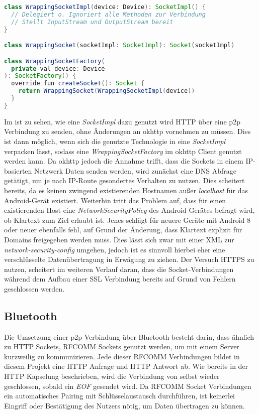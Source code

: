         \begin{lstlisting}[frame=bt, label={lst:android:socketfactory}, language=Java, caption=HTTP Kapselung als SocketFactory (Clientcode in Kotlin)]
class WrappingSocketImpl(device: Device): SocketImpl() {
  // Delegiert o. Ignoriert alle Methoden zur Verbindung
  // Stellt InputStream und OutputStream bereit
}

class WrappingSocket(socketImpl: SocketImpl): Socket(socketImpl)

class WrappingSocketFactory(
  private val device: Device
): SocketFactory() {
  override fun createSocket(): Socket {
    return WrappingSocket(WrappingSocketImpl(device))
  }
}
        \end{lstlisting}
        Im  ist zu sehen, wie eine {\it SocketImpl} dazu genutzt wird HTTP über eine p2p Verbindung zu senden, ohne Änderungen an okhttp vornehmen zu müssen. Dies ist dann möglich, wenn sich die genutzte Technologie in eine {\it SocketImpl} verpacken lässt, sodass eine {\it WrappingSocketFactory} im okhttp Client genutzt werden kann. Da okhttp jedoch die Annahme trifft, dass die Sockets in einem IP-basierten Netzwerk Daten senden werden, wird zunächst eine DNS Abfrage getätigt, um je nach IP-Route gesondertes Verhalten zu nutzen. Dies scheitert bereits, da es keinen zwingend existierenden Hostnamen außer {\it localhost} für das Android-Gerät existiert. Weiterhin tritt das Problem auf, dass für einen existierenden Host eine {\it NetworkSecurityPolicy} des Android Gerätes befragt wird, ob Klartext zum Ziel erlaubt ist. Jenes schlägt für neuere Geräte mit Android 8 oder neuer ebenfalls fehl, auf Grund der Änderung, dass Klartext explizit für Domains freigegeben werden muss. Dies lässt sich zwar mit einer XML zur {\it network-security-config} umgehen, jedoch ist es sinnvoll hierbei eher eine verschlüsselte Datenübertragung in Erwägung zu ziehen. Der Versuch HTTPS zu nutzen, scheitert im weiteren Verlauf daran, dass die Socket-Verbindungen während dem Aufbau einer SSL Verbindung bereits auf Grund von Fehlern geschlossen werden.
        
        \subsection{Bluetooth}
        Die Umsetzung einer p2p Verbindung über Bluetooth besteht darin, dass ähnlich zu HTTP Sockets, RFCOMM Sockets genutzt werden, um mit einem Server kurzweilig zu kommunizieren. Jede dieser RFCOMM Verbindungen bildet in diesem Projekt eine HTTP Anfrage und HTTP Antwort ab. Wie bereits in der HTTP Kapselung beschrieben, wird die Verbindung von selbst wieder geschlossen, sobald ein {\it EOF} gesendet wird. Da RFCOMM Socket Verbindungen ein automatisches Pairing mit Schlüsselaustausch durchführen, ist keinerlei Eingriff oder Bestätigung des Nutzers nötig, um Daten übertragen zu können.
